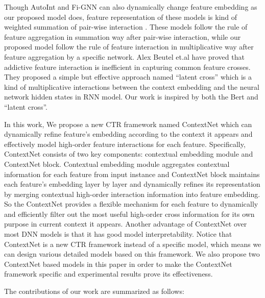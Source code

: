 \documentclass[sigconf]{acmart}
\begin{document}
Though AutoInt\cite{song2019autoint} and Fi-GNN\cite{2019Fi} can also dynamically change feature embedding as our proposed model does,  feature representation of these models is kind of weighted summation of  pair-wise interaction . These models follow the rule of feature aggregation in summation way after pair-wise interaction, while our proposed model follow the rule of feature interaction in multiplicative way after feature aggregation by a specific network. Alex Beutel et.al\cite{2018Latent} have proved that  addictive feature interaction is inefficient in capturing common feature crosses. They proposed  a simple but effective  approach named “latent cross”  which is a kind of multiplicative interactions between the context embedding and the neural network hidden states in RNN model. Our work is inspired by  both  the Bert and “latent cross”.




In this work, We propose a new CTR framework named ContextNet which can dynamically refine feature's embedding according to the context it appears and effectively model high-order feature interactions for each feature. Specifically, ContextNet consists of two key components: contextual embedding module and ContextNet block. Contextual embedding module aggregates contextual information for each feature from input instance and ContextNet block maintains each feature's embedding layer by layer and dynamically refines its representation by merging contextual high-order interaction information into feature embedding. So the ContextNet provides a flexible mechanism for each feature to dynamically and efficiently filter out the most useful high-order cross information for its own purpose in current context it appears. Another advantage of ContextNet over most DNN models is that it has good model interpretability. Notice that ContextNet is a new CTR framework instead of a specific model, which means we can design various detailed models based on this framework. We also propose two ContextNet based models in this paper in order to make the ContextNet framework specific and experimental results prove its effectiveness.




The contributions of our work are summarized as follows:
\end{document}
